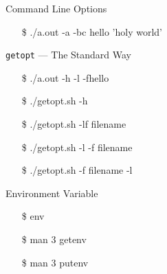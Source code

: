 \begin{frame}{Command Line Options}
  \begin{center}
  \end{center}\ttfamily
  \begin{itemize}
  \item[\$] ./a.out -a -bc hello 'holy world'
  \end{itemize}
\end{frame}

\begin{frame}{\texttt{getopt} --- The Standard Way}
  \begin{iblock}{}
    \centering
  \end{iblock}\ttfamily
  \begin{itemize}
  \item[\$] ./a.out -h -l -fhello
  \end{itemize}
\end{frame}

\begin{frame}
  \begin{iblock}{}
    \begin{center}
    \end{center}
  \end{iblock}\ttfamily
  \begin{itemize}
  \item[\$] ./getopt.sh -h
  \item[\$] ./getopt.sh -lf filename
  \item[\$] ./getopt.sh -l -f filename
  \item[\$] ./getopt.sh -f filename -l
  \end{itemize}
\end{frame}

\begin{frame}{Environment Variable}
  \begin{minipage}{.5\linewidth}
    \centering
  \end{minipage}\quad
  \begin{minipage}{.45\linewidth}
  \ttfamily
  \begin{itemize}
  \item[\$] env
  \item[\$] man 3 getenv
  \item[\$] man 3 putenv
  \end{itemize}  
  \end{minipage}
\end{frame}

